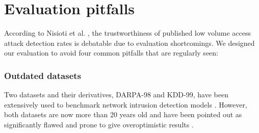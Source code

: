 

\section{Evaluation pitfalls}\label{SecF:Evalmal}

According to Nisioti et al. \cite{nisioti2018intrusion}, the trustworthiness of published low volume access attack detection rates is debatable due to evaluation shortcomings.
We designed our evaluation to avoid four common pitfalls that are regularly seen:

\subsubsection{Outdated datasets}

Two datasets and their derivatives, DARPA-98 %
and KDD-99, have been extensively used to benchmark network intrusion detection models \cite{ozgur2016review}. %
However, both datasets are now more than 20 years old and have been pointed out as significantly flawed and prone to give overoptimistic results %
\cite{tavallaee2009detailed}. %


